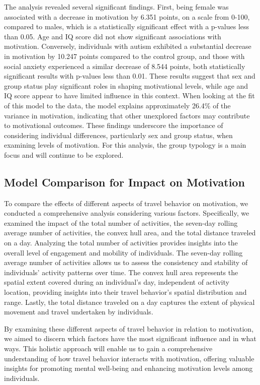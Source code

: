 \documentclass[
  letterpaper,
  number,
  review,
  3p]{elsarticle}
\begin{document}
The analysis revealed several significant findings. First, being female
was associated with a decrease in motivation by 6.351 points, on a scale
from 0-100, compared to males, which is a statistically significant
effect with a p-values less than 0.05. Age and IQ score did not show
significant associations with motivation. Conversely, individuals with
autism exhibited a substantial decrease in motivation by 10.247 points
compared to the control group, and those with social anxiety experienced
a similar decrease of 8.544 points, both statistically significant
results with p-values less than 0.01. These results suggest that sex and
group status play significant roles in shaping motivational levels,
while age and IQ score appear to have limited influence in this context.
When looking at the fit of this model to the data, the model explains
approximately 26.4\% of the variance in motivation, indicating that
other unexplored factors may contribute to motivational outcomes. These
findings underscore the importance of considering individual
differences, particularly sex and group status, when examining levels of
motivation. For this analysis, the group typology is a main focus and
will continue to be explored.

\subsection{Model Comparison for Impact on
Motivation}\label{model-comparison-for-impact-on-motivation}

To compare the effects of different aspects of travel behavior on
motivation, we conducted a comprehensive analysis considering various
factors. Specifically, we examined the impact of the total number of
activities, the seven-day rolling average number of activities, the
convex hull area, and the total distance traveled on a day. Analyzing
the total number of activities provides insights into the overall level
of engagement and mobility of individuals. The seven-day rolling average
number of activities allows us to assess the consistency and stability
of individuals' activity patterns over time. The convex hull area
represents the spatial extent covered during an individual's day,
independent of activity location, providing insights into their travel
behavior's spatial distribution and range. Lastly, the total distance
traveled on a day captures the extent of physical movement and travel
undertaken by individuals.

By examining these different aspects of travel behavior in relation to
motivation, we aimed to discern which factors have the most significant
influence and in what ways. This holistic approach will enable us to
gain a comprehensive understanding of how travel behavior interacts with
motivation, offering valuable insights for promoting mental well-being
and enhancing motivation levels among individuals.
\end{document}
